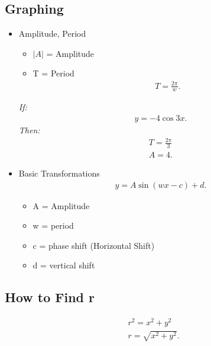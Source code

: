 \documentclass{report}
\begin{document}
      \subsection{Graphing}
      \begin{itemize}
        \item Amplitude, Period
          \begin{itemize}
            \item $|A|$ = Amplitude
            \item T = Period
              \begin{align*}
                T = \frac{2\pi}{w}
              .\end{align*}
          \end{itemize}
          \bigbreak \noindent 
          \textit{If:}
          \begin{align*}
            y = -4\cos{3x}
          .\end{align*}
          \bigbreak \noindent 
          \textit{Then:}
          \begin{align*}
            T=\frac{2\pi}{3} \\
            A = 4
          .\end{align*}
        \item Basic Transformations
          \begin{align*}
            y = A\sin{(wx-c)} + d            
          .\end{align*}
          \begin{itemize}
            \item A = Amplitude
            \item w = period 
            \item c = phase shift (Horizontal Shift)
            \item d = vertical shift
          \end{itemize}
      \end{itemize}


      \bigbreak \noindent \bigbreak \noindent 
      \subsection{How to Find r}
        \begin{align*}
          r^{2} = x^{2}+y^{2} \\
          r = \sqrt{x^{2}+y^{2}}
        .\end{align*}

      \bigbreak \noindent \bigbreak \noindent 
\end{document}
